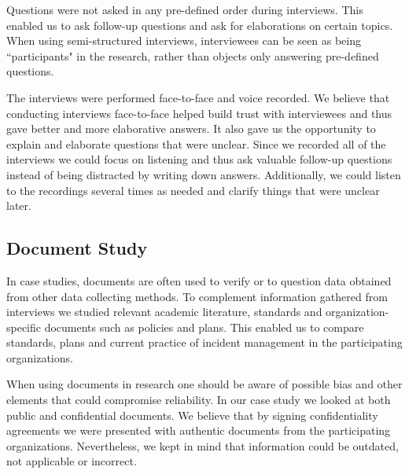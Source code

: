 Questions were not asked in any pre-defined order during interviews. This enabled us to ask follow-up questions and ask for elaborations on certain topics. When using semi-structured interviews, interviewees can be seen as being ``participants" in the research, rather than objects only answering pre-defined questions.

The interviews were performed face-to-face and voice recorded. We believe that conducting interviews face-to-face helped build trust with interviewees and thus gave better and more elaborative answers. It also gave us the opportunity to explain and elaborate questions that were unclear. Since we recorded all of the interviews we could focus on listening and thus ask valuable follow-up questions instead of being distracted by writing down answers. Additionally, we could listen to the recordings several times as needed and clarify things that were unclear later.



\subsection{Document Study}
\label{sec:documentStudy}
In case studies, documents are often used to verify or to question data obtained from other data collecting methods. To complement information gathered from interviews we studied relevant academic literature, standards and organization-specific documents such as policies and plans. This enabled us to compare standards, plans and current practice of incident management in the participating organizations.

When using documents in research one should be aware of possible bias and other elements that could compromise reliability\cite{oates2005researching}. In our case study we looked at both public and confidential documents.  We believe that by signing confidentiality agreements we were presented with authentic documents from the participating organizations. Nevertheless, we kept in mind that information could be outdated, not applicable or incorrect.   

